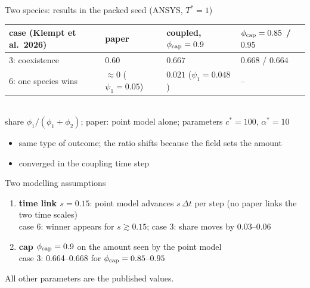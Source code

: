 \documentclass[aspectratio=169,11pt]{beamer}
\begin{document}
\begin{frame}{Two species: results in the packed seed (ANSYS, $T^*=1$)}
\centering
\begin{tabular}{@{}llll@{}}
\toprule
case (Klempt et al.\ 2026) & paper & coupled, $\phi_{\rm cap}=0.9$ & $\phi_{\rm cap}=0.85$ / $0.95$\\
\midrule
3: coexistence & $0.60$ & $0.667$ & $0.668$ / $0.664$\\
6: one species wins & $\approx0$ ($\psi_1=0.05$) & $0.021$ ($\psi_1=0.048$) & --\\
\bottomrule
\end{tabular}\\[4pt]
\footnotesize share $\phi_1/(\phi_1+\phi_2)$; paper: point model alone; parameters $c^*=100$, $\alpha^*=10$
\vspace{10pt}
\begin{itemize}\small
  \item same type of outcome; the ratio shifts because the field sets the amount
  \item converged in the coupling time step
\end{itemize}
\end{frame}

\begin{frame}{Two modelling assumptions}
\begin{enumerate}
  \item \textbf{time link $s=0.15$}: point model advances $s\,\Delta t$ per step
        (no paper links the two time scales)\\
        \small case 6: winner appears for $s\gtrsim0.15$; case 3: share moves by 0.03--0.06
  \item \textbf{cap $\phi_{\rm cap}=0.9$} on the amount seen by the point model\\
        \small case 3: 0.664--0.668 for $\phi_{\rm cap}=0.85$--$0.95$
\end{enumerate}
\vspace{8pt}
\small All other parameters are the published values.
\end{frame}
\end{document}
